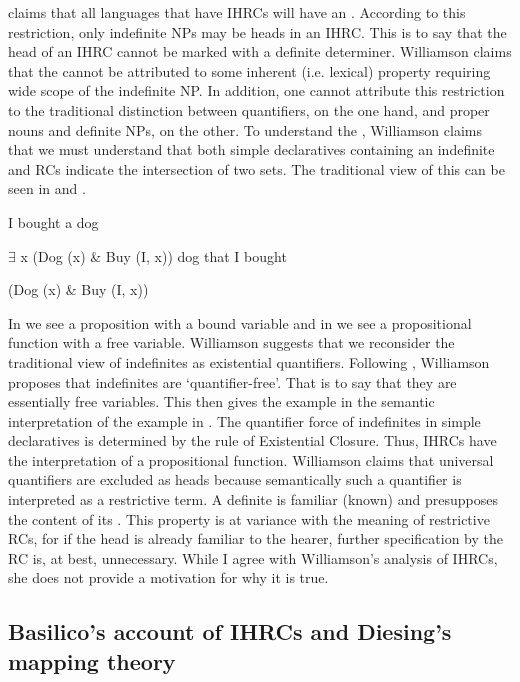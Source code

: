 \documentclass[output=paper]{LSP/langsci}
\begin{document}
\citet{Williamson1987} claims that all languages that have IHRCs will have an . According to this restriction, only indefinite NPs may be heads in an IHRC. This is to say that the head of an IHRC cannot be marked with a definite determiner. Williamson claims that the  cannot be attributed to some inherent (i.e. lexical) property requiring wide scope of the indefinite NP. In addition, one cannot attribute this restriction to the traditional distinction between quantifiers, on the one hand, and proper nouns and definite NPs, on the other. To understand the , Williamson claims that we must understand that both simple declaratives containing an indefinite and RCs indicate the intersection of two sets. The traditional view of this can be seen in  and .

\ea I bought a dog	\label{boyle40}

$\exists$ x (Dog (x) \& Buy (I, x))
\ex dog that I bought \label{boyle41}

(Dog (x) \& Buy (I, x))
\z	
	
In  we see a proposition with a bound variable and in  we see a propositional function with a free variable. Williamson suggests that we reconsider the traditional view of indefinites as existential quantifiers. Following \citet{Heim1982}, Williamson proposes that indefinites are `quantifier-free'. That is to say that they are essentially free variables. This then gives the example in  the semantic interpretation of the example in . The quantifier force of indefinites in simple declaratives is determined by the rule of Existential Closure. Thus, IHRCs have the interpretation of a propositional function. Williamson claims that universal quantifiers are excluded as heads because semantically such a quantifier is interpreted as a restrictive term. A definite is familiar (known) and presupposes the content of its .  This property is at variance with the meaning of restrictive RCs, for if the head is already familiar to the hearer, further specification by the RC is, at best, unnecessary.  While I agree with Williamson's analysis of IHRCs, she does not provide a motivation for why it is true.

\subsection{Basilico's account of IHRCs and Diesing's mapping theory}\label{sec:boyle:6.3}
\end{document}
